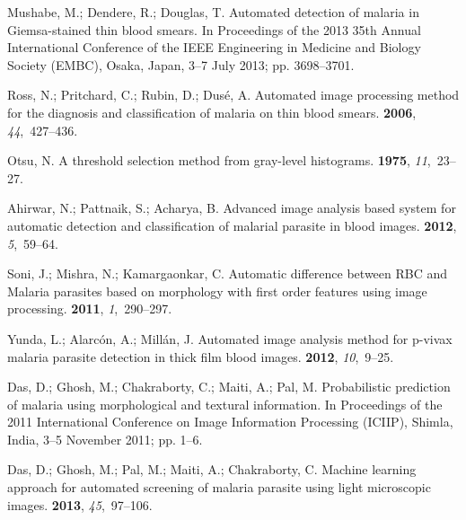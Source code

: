 \documentclass[sensors,review,accept,moreauthors,pdftex,10pt,a4paper]{mdpi}
\begin{document}
\begin{thebibliography}{999}
Mushabe, M.; Dendere, R.; Douglas, T.
\newblock Automated detection of malaria in Giemsa-stained thin blood smears.
\newblock  In Proceedings of the 2013 35th Annual International Conference of
  the IEEE Engineering in Medicine and Biology Society (EMBC), Osaka, Japan, 3--7 July 2013; pp. 3698--3701.
  
Ross, N.; Pritchard, C.; Rubin, D.; Dus{\'e}, A.
\newblock Automated image processing method for the diagnosis and
  classification of malaria on thin blood smears.
 {\bf 2006},
  {\em 44},~427--436.

Otsu, N.
\newblock A threshold selection method from gray-level histograms.
 {\bf 1975}, {\em 11},~23--27.

Ahirwar, N.; Pattnaik, S.; Acharya, B.
\newblock Advanced image analysis based system for automatic detection and
  classification of malarial parasite in blood images.
 {\bf 2012}, {\em 5},~59--64.

Soni, J.; Mishra, N.; Kamargaonkar, C.
\newblock Automatic difference between RBC and Malaria parasites based on
  morphology with first order features using image processing.
  {\bf 2011}, {\em 1},~290--297.

Yunda, L.; Alarc{\'o}n, A.; Mill{\'a}n, J.
\newblock Automated image analysis method for p-vivax malaria parasite
  detection in thick film blood images.
 {\bf 2012}, {\em 10},~9--25.

Das, D.; Ghosh, M.; Chakraborty, C.; Maiti, A.; Pal, M.
\newblock Probabilistic prediction of malaria using morphological and textural
  information.
\newblock  In Proceedings of the 2011 International Conference on Image
  Information Processing (ICIIP), Shimla, India, 3--5 November 2011; pp. 1--6.

Das, D.; Ghosh, M.; Pal, M.; Maiti, A.; Chakraborty, C.
\newblock Machine learning approach for automated screening of malaria parasite
  using light microscopic images.
 {\bf 2013}, {\em 45},~97--106.


\end{thebibliography}
\end{document}
